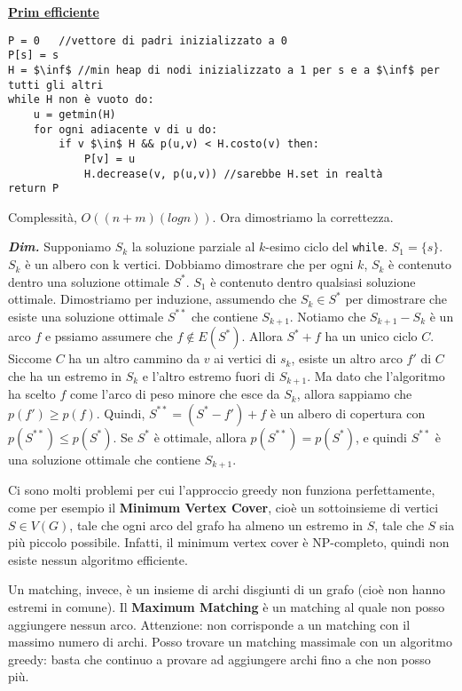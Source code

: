 \documentclass[a4paper,10pt]{article} %
\newcommand{\dimo}[1]{%
    \smallbreak \par \hfill\begin{minipage}{0.92\linewidth}{ \scriptsize {\textbf{\em{Dim.}}} {#1} }\end{minipage} \smallskip \par}
\newcommand{\malgorithm}[1]{%
    {\bigbreak \par \hspace*{4pt} \underline{\textbf {#1}}}}
\renewcommand{\b}[1]{%
    {\textbf{#1}}}
\renewcommand{\t}[1]{%
    {\texttt{#1}}}
\begin{document}
\malgorithm{Prim efficiente}
\begin{lstlisting}
P = 0   //vettore di padri inizializzato a 0
P[s] = s
H = $\inf$ //min heap di nodi inizializzato a 1 per s e a $\inf$ per tutti gli altri
while H non è vuoto do:
    u = getmin(H)
    for ogni adiacente v di u do:
        if v $\in$ H && p(u,v) < H.costo(v) then:
            P[v] = u
            H.decrease(v, p(u,v)) //sarebbe H.set in realtà
return P
\end{lstlisting}

Complessità, $O((n + m)(logn))$.
Ora dimostriamo la correttezza.

\dimo{
    Supponiamo $S_k$ la soluzione parziale al $k$-esimo ciclo del \t{while}.  $S_1 = \{s\}$.  $S_k$ è un albero con k vertici.  Dobbiamo dimostrare che per ogni $k$, $S_k$ è contenuto dentro una soluzione ottimale $S^*$.  $S_1$ è contenuto dentro qualsiasi soluzione ottimale. Dimostriamo per induzione, assumendo che $S_k \in S^*$ per dimostrare che esiste una soluzione ottimale $S^{**}$ che contiene $S_{k+1}$.  Notiamo che $S_{k+1} - S_k$ è un arco $f$ e pssiamo assumere che $f \not \in E(S^*)$. Allora $S^* + f$ ha un unico ciclo $C$.  Siccome $C$ ha un altro cammino da $v$ ai vertici di $s_k$, esiste un altro arco $f'$ di $C$ che ha un estremo in $S_k$ e l'altro estremo fuori di $S_{k+1}$.  Ma dato che l'algoritmo ha scelto $f$ come l'arco di peso minore che esce da $S_k$, allora sappiamo che $p(f') \geq p(f)$.  Quindi, $S^{**} = (S^* - f') + f$ è un albero di copertura con $p(S^{**}) \leq p(S^*)$. Se $S^*$ è ottimale, allora $p(S^{**}) = p(S^*)$, e quindi $S^{**}$ è una soluzione ottimale che contiene $S_{k+1}$.  } 

\medbreak

\medbreak

Ci sono molti problemi per cui l'approccio greedy non funziona perfettamente, come per esempio il \b{Minimum Vertex Cover}, cioè un sottoinsieme di vertici $S \in V(G)$, tale che ogni arco del grafo ha almeno un estremo in $S$, tale che $S$ sia più piccolo possibile. Infatti, il minimum vertex cover è NP-completo, quindi non esiste nessun algoritmo efficiente.

\medbreak

Un matching, invece, è un insieme di archi disgiunti di un grafo (cioè non hanno estremi in comune). Il \b{Maximum Matching} è un matching al quale non posso aggiungere nessun arco. Attenzione: non corrisponde a un matching con il massimo numero di archi.  Posso trovare un matching massimale con un algoritmo greedy: basta che continuo a provare ad aggiungere archi fino a che non posso più.
\end{document}
